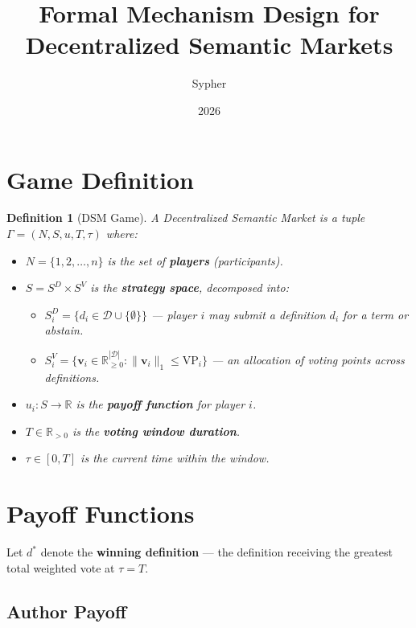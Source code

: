 \documentclass[11pt]{article}
\title{Formal Mechanism Design for Decentralized Semantic Markets}
\author{Sypher}
\date{2026}
\newtheorem{definition}{Definition}
\begin{document}
\maketitle

\section{Game Definition}

\begin{definition}[DSM Game]
A Decentralized Semantic Market is a tuple $\Gamma = (N, S, u, T, \tau)$ where:
\begin{itemize}[nosep]
  \item $N = \{1, 2, \dots, n\}$ is the set of \textbf{players} (participants).
  \item $S = S^D \times S^V$ is the \textbf{strategy space}, decomposed into:
    \begin{itemize}[nosep]
      \item $S^D_i = \{d_i \in \mathcal{D} \cup \{\emptyset\}\}$ — player $i$ may submit a definition $d_i$ for a term or abstain.
      \item $S^V_i = \{\mathbf{v}_i \in \mathbb{R}^{|\mathcal{D}|}_{\geq 0} : \|\mathbf{v}_i\|_1 \leq \text{VP}_i\}$ — an allocation of voting points across definitions.
    \end{itemize}
  \item $u_i : S \to \mathbb{R}$ is the \textbf{payoff function} for player $i$.
  \item $T \in \mathbb{R}_{>0}$ is the \textbf{voting window duration}.
  \item $\tau \in [0, T]$ is the current time within the window.
\end{itemize}
\end{definition}

\section{Payoff Functions}

Let $d^*$ denote the \textbf{winning definition} — the definition receiving the greatest total weighted vote at $\tau = T$.

\subsection{Author Payoff}
\end{document}

